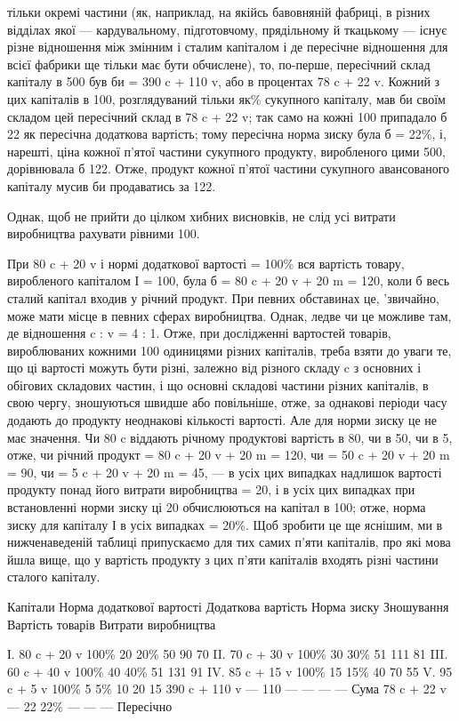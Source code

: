 тільки окремі частини (як, наприклад, на якійсь бавовняній фабриці, в різних відділах якої —
кардувальному, підготовчому, прядільному й ткацькому — існує різне відношення між змінним і
сталим капіталом і де пересічне відношення для всієї фабрики
ще тільки має бути обчислене), то, по-перше, пересічний склад
капіталу в 500 був би = 390 c + 110 v, або в процентах 78 c + 22 v.
Кожний з цих капіталів в 100, розглядуваний тільки як\% сукупного капіталу, мав би своїм складом цей
пересічний склад
в 78 c + 22 v; так само на кожні 100 припадало б 22 як пересічна
додаткова вартість; тому пересічна норма зиску була б = 22\%,
і, нарешті, ціна кожної п’ятої частини сукупного продукту, виробленого цими 500, дорівнювала б 122.
Отже, продукт кожної
п’ятої частини сукупного авансованого капіталу мусив би продаватись за 122.

Однак, щоб не прийти до цілком хибних висновків, не слід
усі витрати виробництва рахувати рівними 100.

При 80 c + 20 v і нормі додаткової вартості = 100\% вся вартість товару, виробленого капіталом І =
100, була б = 80 c + 20 v + 20 m = 120, коли б весь сталий капітал входив у річний продукт. При
певних обставинах це, 'звичайно, може мати місце
в певних сферах виробництва. Однак, ледве чи це можливе там,
де відношення c : v = 4 : 1. Отже, при дослідженні вартостей товарів, вироблюваних кожними 100
одиницями різних капіталів,
треба взяти до уваги те, що ці вартості можуть бути різні, залежно від різного складу c з основних і
обігових складових
частин, і що основні складові частини різних капіталів, в свою
чергу, зношуються швидше або повільніше, отже, за однакові
періоди часу додають до продукту неоднакові кількості вартості. Але для норми зиску це не має
значення. Чи 80 c віддають
річному продуктові вартість в 80, чи в 50, чи в 5, отже, чи річний
продукт = 80 c + 20 v + 20 m = 120, чи = 50 c + 20 v + 20 m = 90, чи = 5 c + 20 v + 20 m = 45, — в
усіх цих випадках надлишок
вартості продукту понад його витрати виробництва = 20, і в усіх
цих випадках при встановленні норми зиску ці 20 обчислюються
на капітал в 100; отже, норма зиску для капіталу І в усіх випадках = 20\%. Щоб зробити це ще яснішим,
ми в нижченаведеній
таблиці припускаємо для тих самих п’яти капіталів, про які мова
йшла вище, що у вартість продукту з цих п’яти капіталів входять різні частини сталого капіталу.

Капітали
Норма додаткової вартості
Додаткова вартість
Норма зиску
Зношування
Вартість товарів
Витрати виробництва

І.    80 c + 20 v    100\%    20    20\%    50    90    70
II.   70 c + 30 v    100\%    30    30\%    51    111    81
III.   60 c + 40 v   100\%    40    40\%    51    131    91
IV.    85 c + 15 v  100\%    15    15\%    40    70    55
V.    95 c + 5 v      100\%    5      5\%      10    20    15
    390 c + 110 v      —    110    —        —     —      — Сума
    78 c + 22 v          —     22    22\%     —     —      — Пересічно
